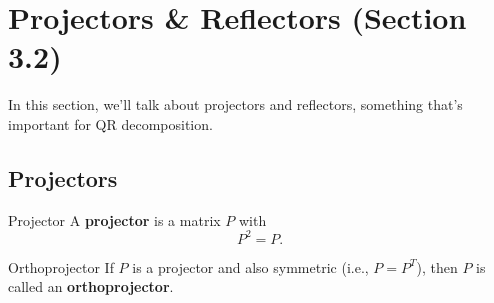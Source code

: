 \documentclass[letterpaper]{article}
\newcommand{\0}{\mathbf{0}}
\begin{document}
\section{Projectors \& Reflectors (Section 3.2)}
In this section, we'll talk about projectors and reflectors, something that's important for QR decomposition.

\subsection{Projectors}
\begin{definition}{Projector}{}
    A \textbf{projector} is a matrix $P$ with \[P^2 = P.\] 
\end{definition}

\begin{definition}{Orthoprojector}{}
    If $P$ is a projector and also symmetric (i.e., $P = P^T$), then $P$ is called an \textbf{orthoprojector}.
\end{definition}
\end{document}
